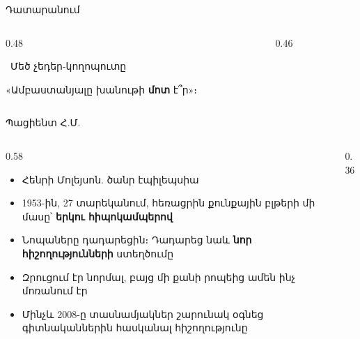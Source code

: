 \begin{frame}{Դատարանում}
  \begin{columns}[T]
    \begin{column}{0.48\textwidth}
      \begin{card}[colback=butter!45!cream]
        \ {\blackfont Մեծ չեդեր-կողոպուտը}\par\smallskip
        «Ամբաստանյալը խանութի \textbf{մոտ} է՞ր»։\par
      \end{card}
    \end{column}
    \begin{column}{0.46\textwidth}
    \end{column}
  \end{columns}
  \vspace{1mm}
\end{frame}

\begin{frame}{Պացիենտ Հ.Մ.}
  \begin{columns}[c]
    \begin{column}{0.58\textwidth}
      \begin{itemize}
        \item Հենրի Մոլեյսոն. ծանր էպիլեպսիա
        \item 1953-ին, 27 տարեկանում, հեռացրին քունքային բլթերի մի մասը՝ \textbf{երկու հիպոկամպերով}
        \item<2-> Նոպաները դադարեցին։ Դադարեց նաև \textbf{նոր հիշողությունների} ստեղծումը
        \item<3-> Զրուցում էր նորմալ, բայց մի քանի րոպեից ամեն ինչ մոռանում էր
        \item<4-> Մինչև 2008-ը տասնամյակներ շարունակ օգնեց գիտնականներին հասկանալ հիշողությունը
      \end{itemize}
    \end{column}
    \begin{column}{0.36\textwidth}
      \centering{}
    \end{column}
  \end{columns}
\end{frame}

